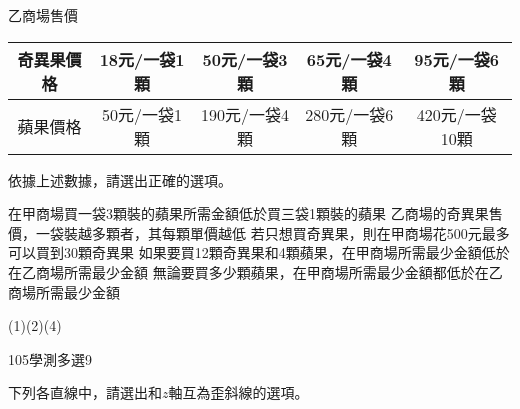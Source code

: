 \begin{QUESTIONS}
\begin{QUESTION}
\begin{QBODY}
\begin{tabular}{|c|c|c|c|c|}
			\end{tabular}
			乙商場售價
			\begin{tabular}{|c|c|c|c|c|}
			\hline			
			奇異果價格  & 18元/一袋1顆	& 50元/一袋3顆	& 65元/一袋4顆	& 95元/一袋6顆 \\\hline
			蘋果價格	& 50元/一袋1顆	& 190元/一袋4顆	& 280元/一袋6顆	& 420元/一袋10顆\\\hline
			\end{tabular}
			依據上述數據，請選出正確的選項。
			\begin{QOPS}
				\QOP 在甲商場買一袋3顆裝的蘋果所需金額低於買三袋1顆裝的蘋果
				\QOP 乙商場的奇異果售價，一袋裝越多顆者，其每顆單價越低
				\QOP 若只想買奇異果，則在甲商場花500元最多可以買到30顆奇異果
				\QOP 如果要買12顆奇異果和4顆蘋果，在甲商場所需最少金額低於在乙商場所需最少金額
				\QOP 無論要買多少顆蘋果，在甲商場所需最少金額都低於在乙商場所需最少金額
			\end{QOPS}
        \end{QBODY}
        \begin{QFROMS}
        \end{QFROMS}
        \begin{QTAGS}\end{QTAGS}
        \begin{QANS}
            (1)(2)(4)
        \end{QANS}
        \begin{QSOLLIST}
        \end{QSOLLIST}
        \begin{QEMPTYSPACE}
        \end{QEMPTYSPACE}
    \end{QUESTION}
    \begin{QUESTION}
        \begin{ExamInfo}{105}{學測}{多選}{9}
        \end{ExamInfo}
        \begin{ExamAnsRateInfo}{46}{77}{40}{21}
        \end{ExamAnsRateInfo}
        \begin{QBODY}
            下列各直線中，請選出和$z$軸互為歪斜線的選項。
			\begin{QOPS}
				\QOP ${{L}_{1}}:\text{ }\left\{ \begin{aligned}
				  & x=0 \\ 
				 & z=0 \\ 
				\end{aligned} \right.$	
                \QOP ${{L}_{\text{2}}}:\text{ }\left\{ \begin{aligned}

\end{aligned}
\end{QOPS}
\end{QBODY}
\end{QUESTION}
\end{QUESTIONS}
